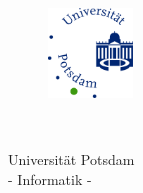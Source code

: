 \thispagestyle{empty}


\begin{figure}[t]
 \centering
 \includegraphics[width=0.2\textwidth]{abb/uni-potsdam-logo}
~~~~~~~~~~
\end{figure}


\begin{verbatim}


\end{verbatim}

\begin{center}
\Large{Universität Potsdam}\\
\Large{- Informatik -}\\
\end{center}


